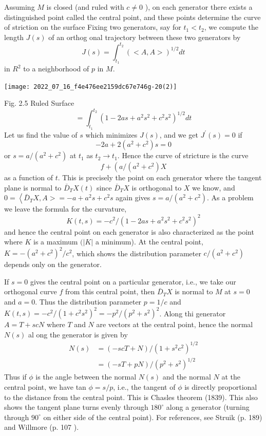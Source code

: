 \documentclass[10pt]{article}
\begin{document}
Assuming $M$ is closed (and ruled with $c \neq 0$ ), on each generator there exists a distinguished point called the central point, and these points determine the curve of striction on the surface Fixing two generators, say for $t_{1}<t_{2}$, we compute the length $J(s)$ of an orthog onal trajectory between these two generators by
$$
J(s)=\int_{t_{1}}^{t_{2}}(<A, A>)^{1 / 2} d t
$$
in $R^{2}$ to a neighborhood of $p$ in $M$.

\texttt{[image: 2022\_07\_16\_f4e476ee2159dc67e746g-20(2)]}

Fig. 2.5 Ruled Surface
$$
=\int_{t_{1}}^{t_{2}}\left(1-2 a s+a^{2} s^{2}+c^{2} s^{2}\right)^{1 / 2} d t
$$
Let us find the value of $s$ which minimizes $J(s)$, and we get $J^{\prime}(s)=0$ if
$$
-2 a+2\left(a^{2}+c^{2}\right) s=0
$$
or $s=a /\left(a^{2}+c^{2}\right)$ at $t_{1}$ as $t_{2} \rightarrow t_{1}$. Hence the curve of stricture is the curve
$$
f+\left(a /\left(a^{2}+c^{2}\right) X\right.
$$
as a function of $t$. This is precisely the point on each generator where the tangent plane is normal to $\bar{D}_{T} X(t)$ since $\bar{D}_{T} X$ is orthogonal to $X$ we know, and $0=\left\langle\bar{D}_{T} X, A>=-a+a^{2} s+c^{2} s\right.$ again gives $s=a /\left(a^{2}+c^{2}\right)$. As a problem we leave the formula for the curvature,
$$
K(t, s)=-c^{2} /\left(1-2 a s+a^{2} s^{2}+c^{2} s^{2}\right)^{2}
$$
and hence the central point on each generator is also characterized as the point where $K$ is a maximum $(|K|$ a minimum). At the central point, $K=-\left(a^{2}+c^{2}\right)^{2} / c^{2}$, which shows the distribution parameter $c /\left(a^{2}+c^{2}\right)$ depends only on the generator.

If $s=0$ gives the central point on a particular generator, i.e., we take our orthogonal curve $f$ from this central point, then $\bar{D}{ }_{T} X$ is normal to $M$ at $s=0$ and $a=0$. Thus the distribution parameter $p=1 / c$ and $K(t, s)=-c^{2} /\left(1+c^{2} s^{2}\right)^{2}=-p^{2} /\left(p^{2}+s^{2}\right)^{2}$. Along thi generator $A=T+s c N$ where $T$ and $N$ are vectors at the central point, hence the normal $N(s)$ al ong the generator is given by
$$
\begin{aligned}
N(s) &=(-s c T+N) /\left(1+s^{2} c^{2}\right)^{1 / 2} \\
&=(-s T+p N) /\left(p^{2}+s^{2}\right)^{1 / 2}
\end{aligned}
$$
Thus if $\phi$ is the angle between the normal $N(s)$ and the normal $N$ at the central point, we have tan $\phi=s / p$, i.e., the tangent of $\phi$ is directly proportional to the distance from the central point. This is Chasles theorem (1839). This also shows the tangent plane turns evenly through $180^{\circ}$ along a generator (turning through $90^{\circ}$ on either side of the central point). For references, see Struik (p. 189) and Willmore (p. 107 ).
\end{document}

